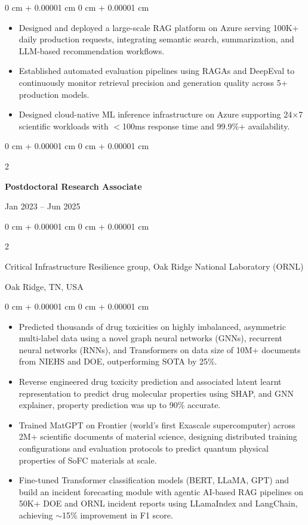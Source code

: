 \documentclass[10pt, letterpaper]{article}
\newenvironment{highlights}{
    \begin{itemize}[
        topsep=0.10 cm,
        parsep=0.10 cm,
        partopsep=0pt,
        itemsep=0pt,
        leftmargin=0 cm + 10pt
    ]
}{
    \end{itemize}
} %
\newenvironment{onecolentry}{
    \begin{adjustwidth}{
        0 cm + 0.00001 cm
    }{
        0 cm + 0.00001 cm
    }
}{
    \end{adjustwidth}
} %
\newenvironment{twocolentry}[2][]{
    \onecolentry
    \def\secondColumn{#2}
    \setcolumnwidth{\fill, 4.5 cm}
    \begin{paracol}{2}
}{
    \switchcolumn \raggedleft \secondColumn
    \end{paracol}
    \endonecolentry
} %
\begin{document}
    \begin{onecolentry}
        \begin{highlights}
            \item Designed and deployed a large-scale RAG platform on Azure serving 100K+ daily production requests, integrating semantic search, summarization, and LLM-based recommendation workflows.
            \item Established automated evaluation pipelines using RAGAs and DeepEval to continuously monitor retrieval precision and generation quality across 5+ production models.
            \item Designed cloud-native ML inference infrastructure on Azure supporting 24$\times$7 scientific workloads with $<$100ms response time and 99.9\%+ availability.
        \end{highlights}
    \end{onecolentry}

\vspace{1mm}

    \begin{twocolentry}{Jan 2023 -- Jun 2025}
        \textbf{Postdoctoral Research Associate}
    \end{twocolentry}
    \begin{twocolentry}{Oak Ridge, TN, USA}
        Critical Infrastructure Resilience group, Oak Ridge National Laboratory (ORNL)
    \end{twocolentry}
    \vspace{0.10 cm}
    \begin{onecolentry}
        \begin{highlights}

            \item Predicted thousands of drug toxicities on highly imbalanced, asymmetric multi-label data using a novel graph neural networks (GNNs), recurrent neural networks (RNNs), and Transformers on data size of 10M+ documents from NIEHS and DOE, outperforming SOTA by 25\%.
            \item Reverse engineered drug toxicity prediction and associated latent learnt representation to predict drug molecular properties using SHAP, and GNN explainer, property prediction was up to 90\% accurate.
            \item Trained MatGPT on Frontier (world’s first Exascale supercomputer) across 2M+ scientific documents of material science, designing distributed training configurations and evaluation protocols to predict quantum physical properties  of SoFC materials at scale.
            \item Fine-tuned Transformer classification models (BERT, LLaMA, GPT) and build an incident forecasting module with agentic AI-based RAG pipelines on 50K+ DOE and ORNL incident reports using LLamaIndex and LangChain, achieving $\sim$15\% improvement in F1 score.
        \end{highlights}
    \end{onecolentry}
\end{document}
